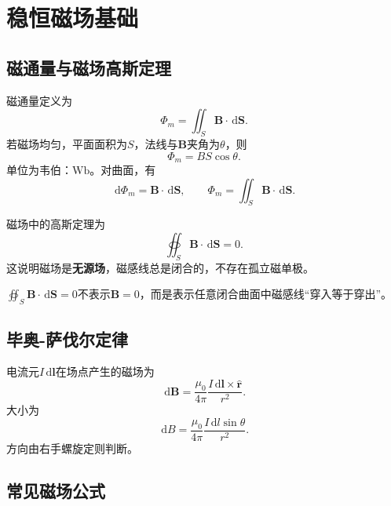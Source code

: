 \documentclass[UTF8,zihao=-4]{ctexart}
\newcommand{\dd}{\,\mathrm d}
\newcommand{\muz}{\mu_0}
\newcommand{\ve}[1]{\bm{#1}}
\newcommand{\B}{\ve B}
\newcommand{\dS}{\dd\ve S}
\begin{document}
\section{稳恒磁场基础}

\subsection{磁通量与磁场高斯定理}

磁通量定义为
\begin{equation}
\Phi_m=\iint_S \B\cdot\dS.
\end{equation}
若磁场均匀，平面面积为\(S\)，法线与\(\B\)夹角为\(\theta\)，则
\begin{equation}
\Phi_m=BS\cos\theta.
\end{equation}
单位为韦伯：\(\mathrm{Wb}\)。对曲面，有
\begin{equation}
\dd\Phi_m=\B\cdot\dS,
\qquad
\Phi_m=\iint_S\B\cdot\dS.
\end{equation}

磁场中的高斯定理为
\begin{equation}
\boxed{\oiint_S\B\cdot\dS=0}.
\end{equation}
这说明磁场是\textbf{无源场}，磁感线总是闭合的，不存在孤立磁单极。

\begin{warnbox}[磁场高斯定理的含义]
\(\oiint_S\B\cdot\dS=0\)不表示\(\B=0\)，而是表示任意闭合曲面中磁感线“穿入等于穿出”。
\end{warnbox}

\subsection{毕奥-萨伐尔定律}

电流元\(I\dd\ve l\)在场点产生的磁场为
\begin{equation}
\boxed{\dd\B=\frac{\muz}{4\pi}\frac{I\dd\ve l\times \hat{\ve r}}{r^2}}.
\end{equation}
大小为
\begin{equation}
\dd B=\frac{\muz}{4\pi}\frac{I\dd l\sin\theta}{r^2}.
\end{equation}
方向由右手螺旋定则判断。

\subsection{常见磁场公式}
\end{document}
